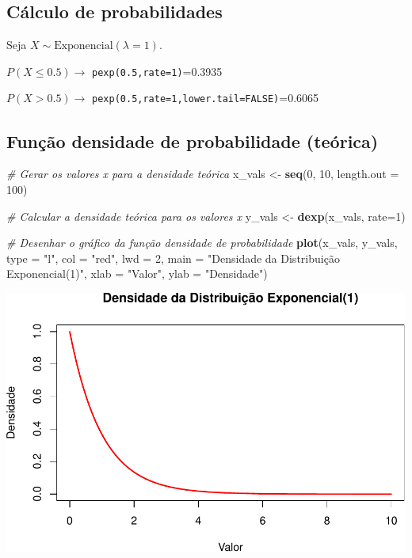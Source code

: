 \documentclass[
]{book}
\newenvironment{Shaded}{\begin{snugshade}}{\end{snugshade}}
\newcommand{\AttributeTok}[1]{\textcolor[rgb]{0.13,0.29,0.53}{#1}}
\newcommand{\CommentTok}[1]{\textcolor[rgb]{0.56,0.35,0.01}{\textit{#1}}}
\newcommand{\DecValTok}[1]{\textcolor[rgb]{0.00,0.00,0.81}{#1}}
\newcommand{\FunctionTok}[1]{\textcolor[rgb]{0.13,0.29,0.53}{\textbf{#1}}}
\newcommand{\NormalTok}[1]{#1}
\newcommand{\OtherTok}[1]{\textcolor[rgb]{0.56,0.35,0.01}{#1}}
\newcommand{\StringTok}[1]{\textcolor[rgb]{0.31,0.60,0.02}{#1}}
\begin{document}
\subsection{Cálculo de probabilidades}\label{cuxe1lculo-de-probabilidades-3}

Seja \(X\sim \text{Exponencial}(\lambda=1)\).

\(P(X\leq 0.5) \to\) \texttt{pexp(0.5,rate=1)}=0.3935

\(P(X > 0.5) \to\) \texttt{pexp(0.5,rate=1,lower.tail=FALSE)}=0.6065

\subsection{Função densidade de probabilidade (teórica)}\label{funuxe7uxe3o-densidade-de-probabilidade-teuxf3rica}

\begin{Shaded}
\begin{Highlighting}[]
\CommentTok{\# Gerar os valores x para a densidade teórica}
\NormalTok{x\_vals }\OtherTok{\textless{}{-}} \FunctionTok{seq}\NormalTok{(}\DecValTok{0}\NormalTok{, }\DecValTok{10}\NormalTok{, }\AttributeTok{length.out =} \DecValTok{100}\NormalTok{)}

\CommentTok{\# Calcular a densidade teórica para os valores x}
\NormalTok{y\_vals }\OtherTok{\textless{}{-}} \FunctionTok{dexp}\NormalTok{(x\_vals, }\AttributeTok{rate=}\DecValTok{1}\NormalTok{)}

\CommentTok{\# Desenhar o gráfico da função densidade de probabilidade}
\FunctionTok{plot}\NormalTok{(x\_vals, y\_vals, }\AttributeTok{type =} \StringTok{"l"}\NormalTok{, }
     \AttributeTok{col =} \StringTok{"red"}\NormalTok{, }\AttributeTok{lwd =} \DecValTok{2}\NormalTok{, }
     \AttributeTok{main =} \StringTok{"Densidade da Distribuição Exponencial(1)"}\NormalTok{,}
     \AttributeTok{xlab =} \StringTok{"Valor"}\NormalTok{, }\AttributeTok{ylab =} \StringTok{"Densidade"}\NormalTok{)}
\end{Highlighting}
\end{Shaded}

\includegraphics{meuLivro2_files/figure-latex/unnamed-chunk-138-1.pdf}
\end{document}
